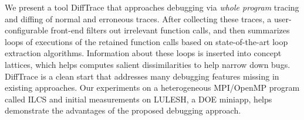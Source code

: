 We present a tool
DiffTrace that approaches debugging via {\em whole program} tracing and
diffing of normal and erroneous traces.
%
After collecting these traces,
a user-configurable front-end filters out irrelevant function calls,
and then summarizes loops of executions of the retained function
calls based on state-of-the-art loop extraction algorithms.
%
Information about these loops is inserted 
into concept lattices, which helps
computes salient dissimilarities to help narrow down bugs.
%
DiffTrace is a clean start that addresses many
debugging features missing in existing approaches.
%
Our experiments on a heterogeneous MPI/OpenMP program called
ILCS and initial measurements on LULESH, a DOE miniapp,
helps demonstrate the advantages of the proposed debugging approach.






